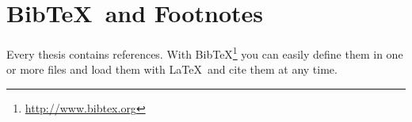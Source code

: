 \chapter{Bib\TeX\ and Footnotes}

Every thesis contains references. With Bib\TeX\footnote{\url{http://www.bibtex.org}} you can easily define them in one or more files and load them with \LaTeX\ and cite them at any time.

